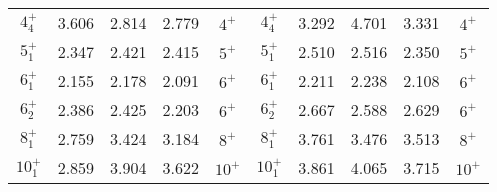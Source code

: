 \begin{table}[htbp]
\begin{center}
\begin{tabular}{ccccc|ccccc}
$4^{+}_{4}$ & 3.606 & 2.814 & 2.779 & $4^{+}$ &
$4^{+}_{4}$ & 3.292 & 4.701 & 3.331 & $4^{+}$ \\
$5^{+}_{1}$ & 2.347 & 2.421 & 2.415 & $5^{+}$ &
$5^{+}_{1}$ & 2.510 & 2.516 & 2.350 & $5^{+}$ \\
$6^{+}_{1}$ & 2.155 & 2.178 & 2.091 & $6^{+}$ &
$6^{+}_{1}$ & 2.211 & 2.238 & 2.108 & $6^{+}$ \\
$6^{+}_{2}$ & 2.386 & 2.425 & 2.203 & $6^{+}$ &
$6^{+}_{2}$ & 2.667 & 2.588 & 2.629 & $6^{+}$ \\
$8^{+}_{1}$ & 2.759 & 3.424 & 3.184 & $8^{+}$ &
$8^{+}_{1}$ & 3.761 & 3.476 & 3.513 & $8^{+}$ \\
$10^{+}_{1}$ & 2.859 & 3.904 & 3.622& $10^{+}$ &
$10^{+}_{1}$ & 3.861 & 4.065 & 3.715 & $10^{+}$ \\
\hline
\end{tabular}
\label{tab:even-2}
\end{center}
\end{table}


